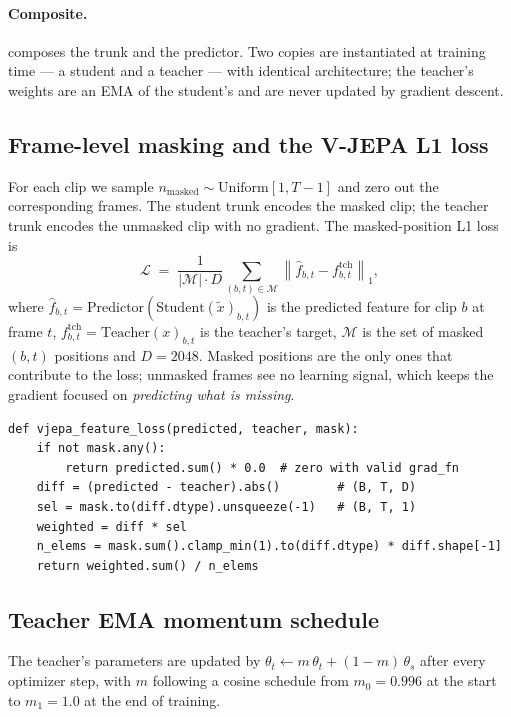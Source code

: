 \paragraph{Composite.}  composes the trunk and the
predictor. Two copies are instantiated at training time --- a student
and a teacher --- with identical architecture; the teacher's weights
are an EMA of the student's and are never updated by gradient descent.

\subsection{Frame-level masking and the V-JEPA L1 loss}
\label{sec:phase3:loss}

For each clip we sample \(n_{\mathrm{masked}} \sim
\mathrm{Uniform}[1, T-1]\) and zero out the corresponding frames. The
student trunk encodes the masked clip; the teacher trunk encodes the
unmasked clip with no gradient. The masked-position L1 loss is
\[
\mathcal{L} \;=\;
\frac{1}{|\mathcal{M}| \cdot D}\sum_{(b,t) \in \mathcal{M}}
\left\| \hat{f}_{b,t} - f^{\mathrm{tch}}_{b,t} \right\|_1,
\]
where \(\hat{f}_{b,t} = \mathrm{Predictor}(\mathrm{Student}(\tilde
x)_{b,t})\) is the predicted feature for clip \(b\) at frame \(t\),
\(f^{\mathrm{tch}}_{b,t} = \mathrm{Teacher}(x)_{b,t}\) is the teacher's
target, \(\mathcal{M}\) is the set of masked \((b, t)\) positions and
\(D=2048\). Masked positions are the only ones that contribute to the
loss; unmasked frames see no learning signal, which keeps the gradient
focused on \emph{predicting what is missing}.

\begin{lstlisting}[style=py]
def vjepa_feature_loss(predicted, teacher, mask):
    if not mask.any():
        return predicted.sum() * 0.0  # zero with valid grad_fn
    diff = (predicted - teacher).abs()        # (B, T, D)
    sel = mask.to(diff.dtype).unsqueeze(-1)   # (B, T, 1)
    weighted = diff * sel
    n_elems = mask.sum().clamp_min(1).to(diff.dtype) * diff.shape[-1]
    return weighted.sum() / n_elems
\end{lstlisting}

\subsection{Teacher EMA momentum schedule}

The teacher's parameters are updated by
\(\theta_t \leftarrow m\,\theta_t + (1-m)\,\theta_s\) after every
optimizer step, with \(m\) following a cosine schedule from
\(m_0 = 0.996\) at the start to \(m_1 = 1.0\) at the end of training.

